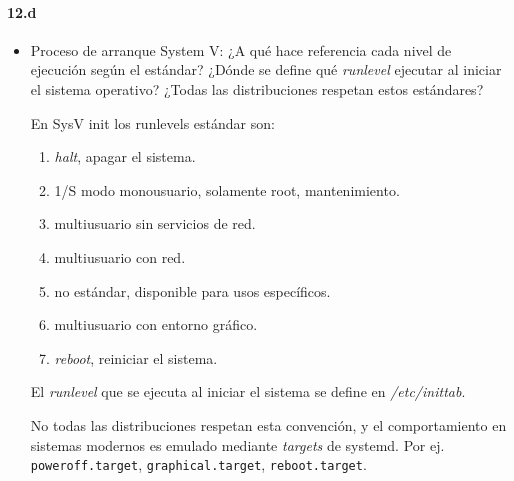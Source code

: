 \documentclass[10pt,a4paper]{paper}
\begin{document}
\paragraph{12.d}
\begin{itemize}
	
	\item {Proceso de arranque System V:} ¿A qué hace referencia cada nivel de ejecución según el estándar? ¿Dónde se define qué \textit{runlevel} ejecutar al iniciar el sistema operativo? ¿Todas las distribuciones respetan estos estándares?
	
	En SysV init los runlevels estándar son:
	
	\begin{enumerate}
		\item[0] \textit{halt}, apagar el sistema.
		
		\item[1] 1/S modo monousuario, solamente root, mantenimiento.
		
		\item[2] multiusuario sin servicios de red.
		
		\item[3] multiusuario con red.
		
		\item[4] no estándar, disponible para usos específicos.
		
		\item[5] multiusuario con entorno gráfico.
		
		\item[6] \textit{reboot}, reiniciar el sistema.
	\end{enumerate}
	
	El \textit{runlevel} que se ejecuta al iniciar el sistema se define en \textit{/etc/inittab}.
	
	
	No todas las distribuciones respetan esta convención, y el comportamiento en sistemas modernos es emulado mediante \textit{targets} de systemd. Por ej. \texttt{poweroff.target}, \texttt{graphical.target}, \texttt{reboot.target}.
	
	
	
\end{itemize}




	
\end{document}
